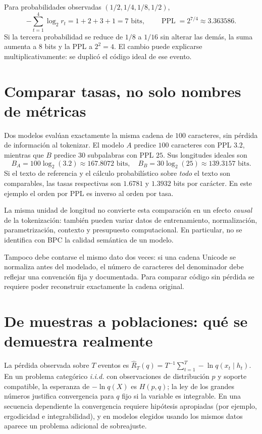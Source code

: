 \begin{ejemplo}
Para probabilidades observadas $(1/2,1/4,1/8,1/2)$,
\[
-\sum_{t=1}^4\log_2r_t=1+2+3+1=7\text{ bits},
\qquad\operatorname{PPL}=2^{7/4}\approx3.363586.
\]
Si la tercera probabilidad se reduce de $1/8$ a $1/16$ sin alterar las demás,
la suma aumenta a $8$ bits y la PPL a $2^2=4$. El cambio puede
explicarse multiplicativamente: se duplicó el código ideal de ese evento.
\end{ejemplo}

\section*{Comparar tasas, no solo nombres de métricas}
Dos modelos evalúan exactamente la misma cadena de $100$ caracteres,
sin pérdida de información al tokenizar. El modelo $A$ predice
$100$ caracteres con PPL $3.2$, mientras que $B$ predice $30$ subpalabras
con PPL $25$. Sus longitudes ideales son
\[
B_A=100\log_2(3.2)\approx167.8072\text{ bits},\quad
B_B=30\log_2(25)\approx139.3157\text{ bits}.
\]
Si el texto de referencia y el cálculo probabilístico sobre \emph{todo} el texto
son comparables, las tasas respectivas son $1.6781$ y $1.3932$ bits por
carácter. En este ejemplo el orden por PPL es inverso al orden por tasa.

\begin{nota}
La misma unidad de longitud no convierte esta comparación en un efecto
\emph{causal} de la tokenización: también pueden variar datos de entrenamiento,
normalización, parametrización, contexto y presupuesto computacional. En particular,
no se identifica con BPC la calidad semántica de un modelo.
\end{nota}
Tampoco debe contarse el mismo dato dos veces: si una cadena Unicode se
normaliza antes del modelado, el número de caracteres del denominador debe
reflejar una convención fija y documentada. Para comparar código sin pérdida
se requiere poder reconstruir exactamente la cadena original.

\section*{De muestras a poblaciones: qué se demuestra realmente}
La pérdida observada sobre $T$ eventos es
$\widehat R_T(q)=T^{-1}\sum_{t=1}^T-\ln q(x_t\mid h_t)$.
En un problema categórico \emph{i.i.d.} con observaciones de distribución
$p$ y soporte compatible, la esperanza de $-\ln q(X)$ es $H(p,q)$;
la ley de los grandes números justifica convergencia para $q$ fijo
si la variable es integrable. En una secuencia dependiente la convergencia
requiere hipótesis apropiadas (por ejemplo, ergodicidad e integrabilidad),
y en modelos elegidos usando los mismos datos aparece un problema adicional
de sobreajuste.

